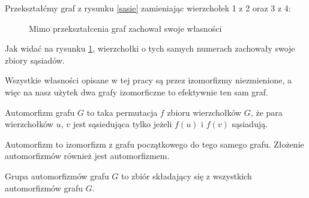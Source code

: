   Przekształćmy graf z rysunku \ref{sasie} zamieniając wierzchołek 1 z 2 oraz 3 z 4:
  \begin{figure}[H]
    \centering
    \hspace{15mm}
    \caption{Mimo przekształcenia graf zachował swoje własności}
    \label{sasieizo}
  \end{figure}

  Jak widać na rysunku \ref{sasieizo}, wierzchołki o tych samych numerach zachowały swoje zbiory sąsiadów. 

  Wszystkie własności opisane w tej pracy są przez izomorfizmy niezmienione, a więc na nasz użytek dwa grafy izomorficzne to efektywnie ten sam graf.


  \begin{definition}
    Automorfizm grafu $G$ to taka permutacja $f$ zbioru wierzchołków $G$, że para wierzchołków $u$, $v$ jest sąsiedująca tylko jeżeli $f(u)$ i $f(v)$ sąsiadują\cite{graphtheory}.
  \end{definition}
  Automorfizm to izomorfizm z grafu początkowego do tego samego grafu. 
  Złożenie automorfizmów również jest automorfizmem.  

  \begin{definition}
    Grupa automorfizmów grafu $G$ to zbiór składający się z wszystkich automorfizmów grafu $G$.
  \end{definition}

